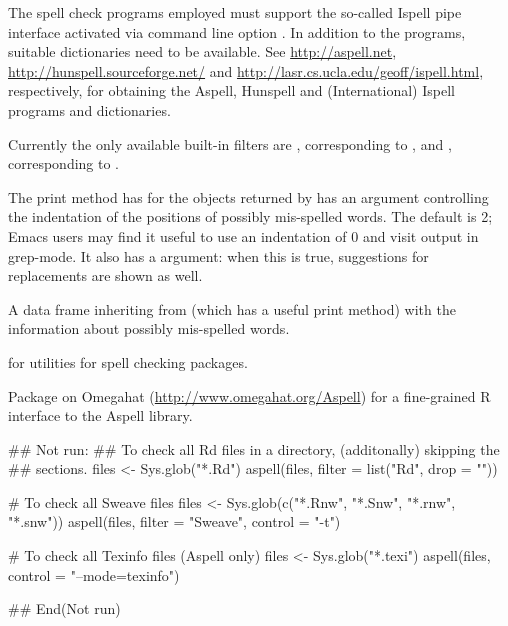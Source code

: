 %
\begin{Details}\relax
The spell check programs employed must support the so-called Ispell
pipe interface activated via command line option .  In
addition to the programs, suitable dictionaries need to be available.
See \url{http://aspell.net},
\url{http://hunspell.sourceforge.net/} and
\url{http://lasr.cs.ucla.edu/geoff/ispell.html}, respectively, for
obtaining the Aspell, Hunspell and (International) Ispell programs and
dictionaries.

Currently the only available built-in filters are ,
corresponding to , and ,
corresponding to .

The print method has for the objects returned by  has an
 argument controlling the indentation of the positions of
possibly mis-spelled words.  The default is 2; Emacs users may find it
useful to use an indentation of 0 and visit output in grep-mode.  It
also has a  argument: when this is true, suggestions for
replacements are shown as well.
\end{Details}
%
\begin{Value}
A data frame inheriting from  (which has a useful print
method) with the information about possibly mis-spelled words.
\end{Value}
%
\begin{SeeAlso}\relax
{} for utilities for spell checking packages.

Package  on Omegahat
(\url{http://www.omegahat.org/Aspell}) for a fine-grained R interface
to the Aspell library.
\end{SeeAlso}
%
\begin{Examples}
\begin{ExampleCode}
## Not run: 
## To check all Rd files in a directory, (additonally) skipping the
##  sections.
files <- Sys.glob("*.Rd")
aspell(files, filter = list("Rd", drop = ""))

# To check all Sweave files
files <- Sys.glob(c("*.Rnw", "*.Snw", "*.rnw", "*.snw"))
aspell(files, filter = "Sweave", control = "-t")

# To check all Texinfo files (Aspell only)
files <- Sys.glob("*.texi")
aspell(files, control = "--mode=texinfo")

## End(Not run)
\end{ExampleCode}
\end{Examples}
